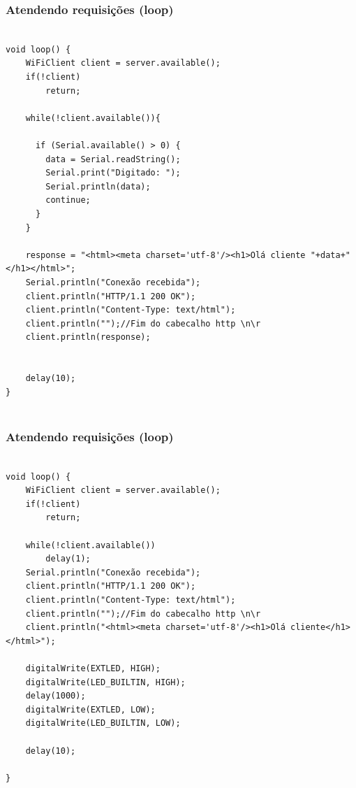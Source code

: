 \documentclass{beamer}
\begin{document}
\begin{frame}[fragile]
\frametitle{Atendendo requisições (loop)}

\tiny
\begin{lstlisting}

void loop() {
    WiFiClient client = server.available();
    if(!client)
        return;

    while(!client.available()){

      if (Serial.available() > 0) {
        data = Serial.readString();
        Serial.print("Digitado: ");
        Serial.println(data);  
        continue;
      }
    }

    response = "<html><meta charset='utf-8'/><h1>Olá cliente "+data+"</h1></html>";
    Serial.println("Conexão recebida");
    client.println("HTTP/1.1 200 OK");
    client.println("Content-Type: text/html");
    client.println("");//Fim do cabecalho http \n\r
    client.println(response);


    delay(10);  
}
 
\end{lstlisting}
\end{frame}



\begin{frame}[fragile]
\frametitle{Atendendo requisições (loop)}

\tiny
\begin{lstlisting}

void loop() {
    WiFiClient client = server.available();
    if(!client)
        return;
        
    while(!client.available())
        delay(1);
    Serial.println("Conexão recebida");
    client.println("HTTP/1.1 200 OK");
    client.println("Content-Type: text/html");
    client.println("");//Fim do cabecalho http \n\r
    client.println("<html><meta charset='utf-8'/><h1>Olá cliente</h1></html>");

    digitalWrite(EXTLED, HIGH);
    digitalWrite(LED_BUILTIN, HIGH);
    delay(1000);
    digitalWrite(EXTLED, LOW);
    digitalWrite(LED_BUILTIN, LOW);

    delay(10);
  
}
 
\end{lstlisting}
\end{frame}
\end{document}
